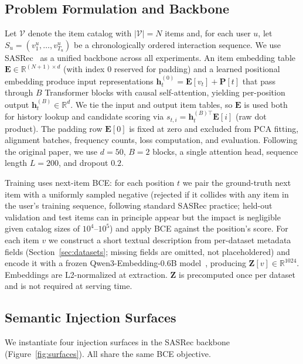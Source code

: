 \documentclass{article}
\begin{document}
\subsection{Problem Formulation and Backbone}

Let $\mathcal{V}$ denote the item catalog with $|\mathcal{V}| = N$
items and, for each user $u$, let
$S_u = (v_1^u, \ldots, v_{T_u}^u)$ be a chronologically ordered
interaction sequence. We use SASRec~\cite{kang2018sasrec} as a unified
backbone across all experiments. An item embedding table
$\mathbf{E} \in \mathbb{R}^{(N+1) \times d}$ (with index $0$ reserved
for padding) and a learned positional embedding produce input
representations $\mathbf{h}^{(0)}_t = \mathbf{E}[v_t] + \mathbf{P}[t]$
that pass through $B$ Transformer blocks with causal self-attention,
yielding per-position output $\mathbf{h}^{(B)}_t \in \mathbb{R}^d$.
We tie the input and output item tables, so $\mathbf{E}$ is used both
for history lookup and candidate scoring via
$s_{t,i} = \mathbf{h}^{(B)\top}_t \mathbf{E}[i]$ (raw dot product).
The padding row $\mathbf{E}[0]$ is fixed at zero and excluded from
PCA fitting, alignment batches, frequency counts, loss computation,
and evaluation. Following the original paper, we use $d = 50$,
$B = 2$ blocks, a single attention head, sequence length $L = 200$,
and dropout $0.2$.

Training uses next-item BCE: for each position $t$ we pair the
ground-truth next item with a uniformly sampled negative (rejected
if it collides with any item in the user's training sequence,
following standard SASRec practice; held-out validation and test
items can in principle appear but the impact is negligible given
catalog sizes of $10^4$--$10^5$) and apply BCE against the
position's score. For each item $v$ we construct a short textual
description from per-dataset metadata fields
(Section~\ref{sec:datasets}; missing fields are omitted, not
placeholdered) and encode it with a frozen Qwen3-Embedding-0.6B
model~\cite{qwen3embed},
producing $\mathbf{Z}[v] \in \mathbb{R}^{1024}$. Embeddings are
L2-normalized at extraction. $\mathbf{Z}$ is precomputed once per
dataset and is not required at serving time.

\subsection{Semantic Injection Surfaces}
\label{sec:surfaces}

We instantiate four injection surfaces in the SASRec backbone
(Figure~\ref{fig:surfaces}). All share the same BCE objective.
\end{document}
